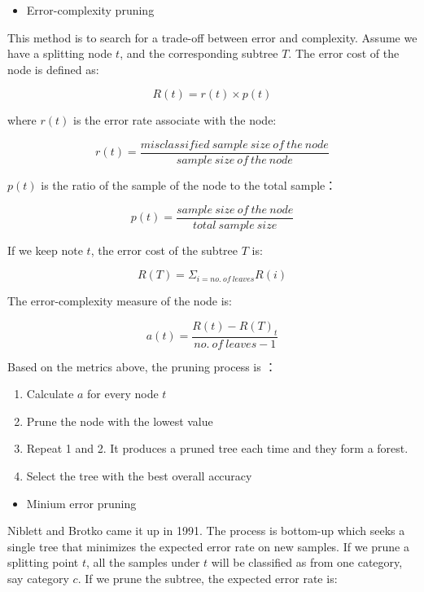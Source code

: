 \documentclass[12pt,]{krantz}
\providecommand{\tightlist}{%
  \setlength{\itemsep}{0pt}\setlength{\parskip}{0pt}}
\begin{document}
\begin{itemize}
\tightlist
\item
  Error-complexity pruning
\end{itemize}

This method is to search for a trade-off between error and complexity. Assume we have a splitting node \(t\), and the corresponding subtree \(T\). The error cost of the node is defined as:

\[R(t)=r(t)\times p(t)\]

where \(r(t)\) is the error rate associate with the node:

\[r(t)=\frac{misclassified\ sample\ size\ of\ the\ node}{sample\ size\ of\ the\ node}\]

\(p(t)\) is the ratio of the sample of the node to the total sample：

\[p(t)=\frac{ sample\ size\ of\ the\ node}{total\ sample\ size}\]

If we keep note \(t\), the error cost of the subtree \(T\) is:

\[R(T)=\Sigma_{i = no.\ of\ leaves} R(i)\]

The error-complexity measure of the node is:

\[a(t)=\frac{R(t)-R(T)_{t}}{no.\ of\ leaves - 1}\]

Based on the metrics above, the pruning process is \citep{Nikita2012}：

\begin{enumerate}
\def\labelenumi{\arabic{enumi}.}
\tightlist
\item
  Calculate \(a\) for every node \(t\)
\item
  Prune the node with the lowest value
\item
  Repeat 1 and 2. It produces a pruned tree each time and they form a forest.
\item
  Select the tree with the best overall accuracy
\end{enumerate}

\begin{itemize}
\tightlist
\item
  Minium error pruning
\end{itemize}

Niblett and Brotko came it up in 1991\citep{Cestnik1991}. The process is bottom-up which seeks a single tree that minimizes the expected error rate on new samples. If we prune a splitting point \(t\), all the samples under \(t\) will be classified as from one category, say category \(c\). If we prune the subtree, the expected error rate is:
\end{document}
